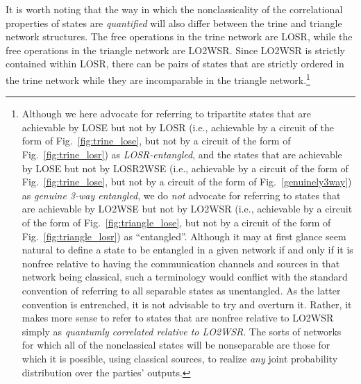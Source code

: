 \documentclass[12pt]{article}
\theoremstyle{plain}
\theoremstyle{definition}
\begin{document}
\begin{appendices}
It is worth noting that the way in which the nonclassicality of the correlational properties of states are {\em quantified} will also differ between the trine and triangle network structures. The free operations in the trine network are LOSR, while the free operations in the triangle network are LO2WSR.
 Since LO2WSR is strictly contained within LOSR, there can be pairs of states that are strictly ordered in the trine network while they are incomparable in the triangle network.\footnote{Although we here advocate for referring to tripartite states that are achievable by LOSE but not by LOSR 
     (i.e., achievable by a circuit of the form of Fig.~\ref{fig:trine_lose}, but not by a circuit of the form of Fig.~\ref{fig:trine_losr})
     as {\em LOSR-entangled}, and the states that are achievable by LOSE but not by LOSR2WSE (i.e., achievable by a circuit of the form of Fig.~\ref{fig:trine_lose}, but not by a circuit of the form of Fig.~\ref{genuinely3way}) as {\em genuine 3-way entangled}, we  do {\em not} advocate for referring to states that are achievable by LO2WSE but not by LO2WSR  (i.e., achievable by a circuit of the form of Fig.~\ref{fig:triangle_lose}, but not by a circuit of the form of Fig.~\ref{fig:triangle_losr})
  as ``entangled''.
  Although it may at first glance seem natural to define a state to be entangled in a given network if and only if it is nonfree relative to having the communication channels and sources in that network being classical,
   such a terminology would conflict with the standard convention of referring to all separable states as unentangled.  As the latter convention is entrenched, it is not advisable to try and overturn it. Rather, it makes more sense to refer to states that are nonfree relative to LO2WSR
  simply as {\em quantumly correlated relative to LO2WSR}.  The sorts of networks for which all of the nonclassical states will be nonseparable are those for which it is possible, using classical sources, to realize {\em any} joint probability distribution over the parties' outputs. }


\end{appendices}
\end{document}
